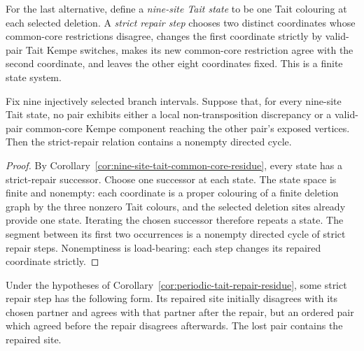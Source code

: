 For the last alternative, define a \emph{nine-site Tait state} to be one
Tait colouring at each selected deletion.  A \emph{strict repair step}
chooses two distinct coordinates whose common-core restrictions disagree,
changes the first coordinate strictly by valid-pair Tait Kempe switches,
makes its new common-core restriction agree with the second coordinate, and
leaves the other eight coordinates fixed.  This is a finite state system.

\begin{corollary}
\label{cor:periodic-tait-repair-residue}
Fix nine injectively selected branch intervals.  Suppose that, for every
nine-site Tait state, no pair exhibits either a local non-transposition
discrepancy or a valid-pair common-core Kempe component reaching the other
pair's exposed vertices.  Then the strict-repair relation contains a
nonempty directed cycle.
\end{corollary}

\begin{proof}
By Corollary~\ref{cor:nine-site-tait-common-core-residue}, every state has a
strict-repair successor.  Choose one successor at each state.  The state
space is finite and nonempty: each coordinate is a proper colouring of a
finite deletion graph by the three nonzero Tait colours, and the selected
deletion sites already provide one state.  Iterating the chosen successor
therefore repeats a state.  The segment between its first two occurrences is
a nonempty directed cycle of strict repair steps.  Nonemptiness is
load-bearing: each step changes its repaired coordinate strictly.
\end{proof}

\begin{corollary}
\label{cor:anchored-agreement-trade-residue}
Under the hypotheses of
Corollary~\ref{cor:periodic-tait-repair-residue}, some strict repair step has
the following form.  Its repaired site initially disagrees with its chosen
partner and agrees with that partner after the repair, but an ordered pair
which agreed before the repair disagrees afterwards.  The lost pair contains
the repaired site.
\end{corollary}

